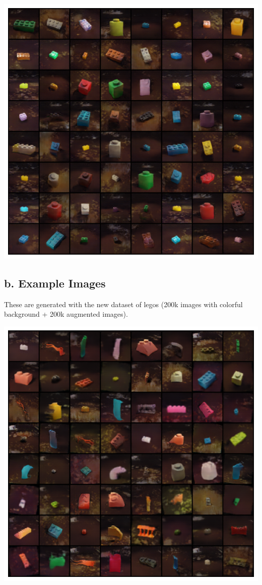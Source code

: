 \documentclass[]{article}
\begin{document}
\begin{itemize}
    \includegraphics[scale = 0.4]{imgs/gan bricks only.png}
\end{itemize}

\newpage
\subsection*{b. Example Images}
These are generated with the new dataset of legos (200k images with colorful background + 200k augmented images).
\begin{center}
\includegraphics[scale=0.65]{imgs/gan with augmentation.png}
\end{center}
\end{document}
